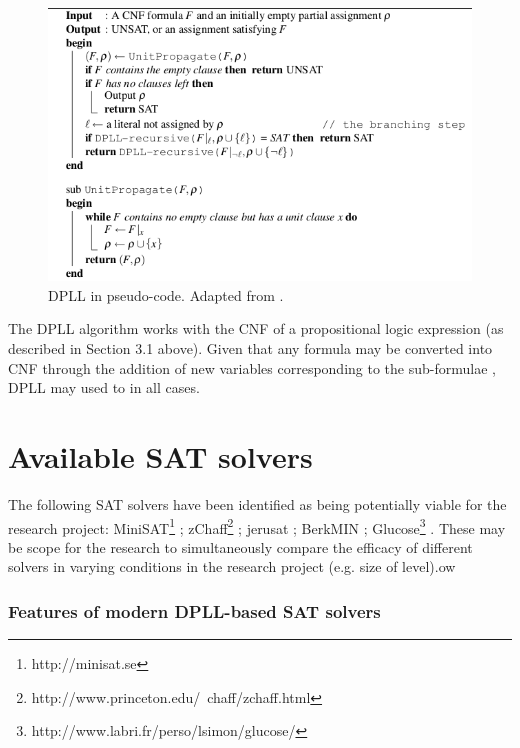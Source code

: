 \documentclass[11pt, a4paper, oneside]{report} %
\begin{document}
\begin{figure}[h!]
  
  \centering
    \includegraphics[scale=0.47]{dpll}
  \caption{DPLL in pseudo-code. Adapted from \cite{balyo2010solving,gomes2008satisfiability}.}
  \label{DPLL}
\end{figure}

The DPLL algorithm works with the CNF of a propositional logic expression (as described in Section
3.1 above). Given that any formula may be converted into CNF through the addition of new variables
corresponding to the sub-formulae \cite{tseitin1983complexity,Goldreich:2008}, DPLL may used to in
all cases.

\section{Available SAT solvers}

The following SAT solvers have been identified as being potentially viable for the research project: MiniSAT\footnote{http://minisat.se}  \cite{sorensson2005minisat}; zChaff\footnote{http://www.princeton.edu/~chaff/zchaff.html} \cite{marques1999impact}; jerusat \cite{nadel2002jerusat}; BerkMIN \cite{Goldberg20071549}; Glucose\footnote{http://www.labri.fr/perso/lsimon/glucose/} \cite{audemard2009glucose}.
These may be scope for the research to simultaneously compare the efficacy of different solvers in
varying conditions in the research project (e.g. size of level).ow


\subsubsection{Features of modern DPLL-based SAT solvers}
\end{document}
